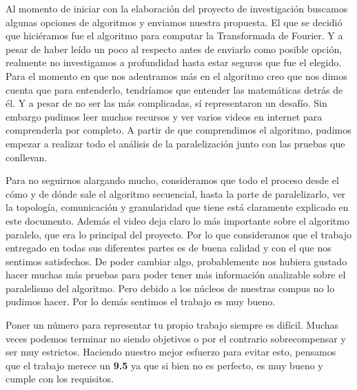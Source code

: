 \documentclass{report}
\begin{document}
Al momento de iniciar con la elaboración del proyecto de investigación buscamos algunas opciones de algoritmos y enviamos nuestra propuesta. El que se decidió que hiciéramos fue el algoritmo para computar la Transformada de Fourier. Y a pesar de haber leído un poco al respecto antes de enviarlo como posible opción, realmente no investigamos a profundidad hasta estar seguros que fue el elegido. Para el momento en que nos adentramos más en el algoritmo creo que nos dimos cuenta que para entenderlo, tendríamos que entender las matemáticas detrás de él. Y a pesar de no ser las más complicadas, sí representaron un desafío. Sin embargo pudimos leer muchos recursos y ver varios videos en internet para comprenderla por completo. A partir de que comprendimos el algoritmo, pudimos empezar a realizar todo el análisis de la paralelización junto con las pruebas que conllevan.\medskip

Para no seguirnos alargando mucho, consideramos que todo el proceso desde el cómo y de dónde sale el algoritmo secuencial, hasta la parte de paralelizarlo, ver la topología, comunicación y granularidad que tiene está claramente explicado en este documento. Además el video deja claro lo más importante sobre el algoritmo paralelo, que era lo principal del proyecto. Por lo que consideramos que el trabajo entregado en todas sus diferentes partes es de buena calidad y con el que nos sentimos satisfechos. De poder cambiar algo, probablemente nos hubiera gustado hacer muchas más pruebas para poder tener más información analizable sobre el paralelismo del algoritmo. Pero debido a los núcleos de nuestras compus no lo pudimos hacer. Por lo demás sentimos el trabajo es muy bueno.\medskip

Poner un número para representar tu propio trabajo siempre es difícil. Muchas veces podemos terminar no siendo objetivos o por el contrario sobrecompensar y ser muy estrictos. Haciendo nuestro mejor esfuerzo para evitar esto, pensamos que el trabajo merece un \textbf{9.5} ya que si bien no es perfecto, es muy bueno y cumple con los requisitos.

\nocite{*}
\printbibliography[title={Fuentes de información}]
\end{document}
